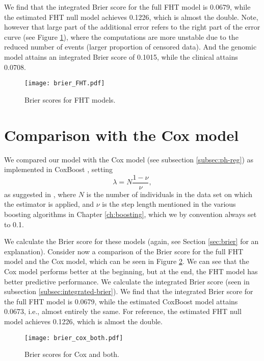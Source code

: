 We find that the integrated Brier score for the full FHT model is 0.0679, while the estimated FHT null model achieves 0.1226, which is almost the double.
Note, however that large part of the additional error refers to the right part of the error curve (see Figure \ref{fig:brier-FHT}), where the computations are more unstable due to the reduced number of events (larger proportion of censored data).
And the genomic model attains an integrated Brier score of 0.1015, while the clinical attains 0.0708.

\begin{figure}
\caption{Brier scores for FHT models.}
\label{fig:brier-FHT}
\centering\texttt{[image: brier\_FHT.pdf]}
\end{figure}

\section{Comparison with the Cox model}
We compared our model with the Cox model (see subsection \ref{subsec:ph-reg}) as implemented in CoxBoost \citep{}, setting
\begin{equation}\label{eq:lambda-nu}
    \lambda=N\frac{1-\nu}{\nu},
\end{equation}
as suggested in \citet{DeBin2016}, where $N$ is the number of individuals in the data set on which the estimator is applied, and $\nu$ is the step length mentioned in the various boosting algorithms in Chapter \ref{ch:boosting}, which we by convention always set to 0.1.

We calculate the Brier score for these models (again, see Section \ref{sec:brier} for an explanation).
Consider now a comparison of the Brier score for the full FHT model and the Cox model, which can be seen in Figure \ref{fig:brier-cox-both}.
We can see that the Cox model performs better at the beginning, but at the end, the FHT model has better predictive performance.
We calculate the integrated Brier score (seen in subsection \ref{subsec:integrated-brier}).
We find that the integrated Brier score for the full FHT model is 0.0679, while the estimated CoxBoost model attains 0.0673, i.e., almost entirely the same.
For reference, the estimated FHT null model achieves 0.1226, which is almost the double.

\begin{figure}
\caption{Brier scores for Cox and both.}
\label{fig:brier-cox-both}
\centering\texttt{[image: brier\_cox\_both.pdf]}
\end{figure}


